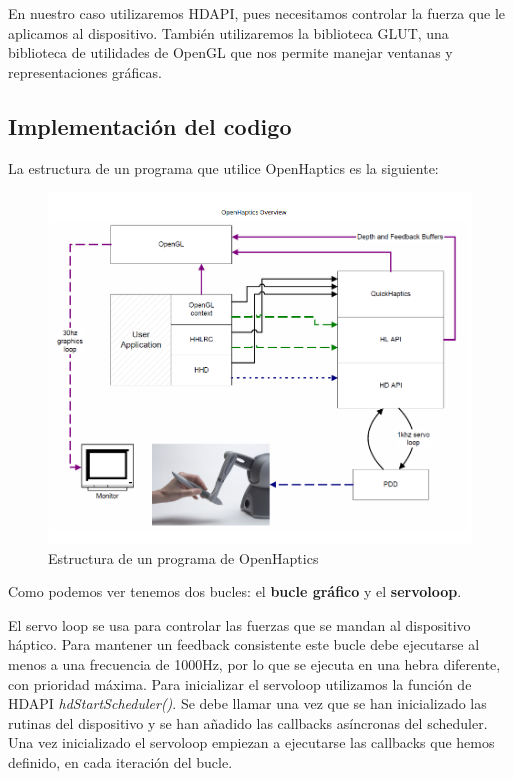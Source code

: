 \documentclass[a4paper,11pt, oneside]{book}
\begin{document}
En nuestro caso utilizaremos HDAPI, pues necesitamos controlar la fuerza que le aplicamos al dispositivo. También utilizaremos la biblioteca GLUT, una biblioteca de utilidades de OpenGL que nos permite manejar ventanas y representaciones gráficas.

\subsection{Implementación del codigo}

La estructura de un programa que utilice OpenHaptics es la siguiente: 

\begin{figure}[H]
	
	\centering
	\includegraphics[width=\linewidth]{estructura}
	\caption{Estructura de un programa de OpenHaptics}
	\label{fig:figura1}
	
\end{figure}


Como podemos ver tenemos dos bucles: el \textbf{bucle gráfico} y el \textbf{servoloop}.

El servo loop se usa para controlar las fuerzas que se mandan al dispositivo háptico. Para mantener un feedback consistente este bucle debe ejecutarse al menos a una frecuencia de 1000Hz, por lo que se ejecuta en una hebra diferente, con prioridad máxima. Para inicializar el servoloop utilizamos la función de HDAPI \textit{hdStartScheduler()}. Se debe llamar una vez que se han inicializado las rutinas del dispositivo y se han añadido las callbacks asíncronas del scheduler. Una vez inicializado el servoloop empiezan a ejecutarse las callbacks que hemos definido, en cada iteración del bucle.
\end{document}
